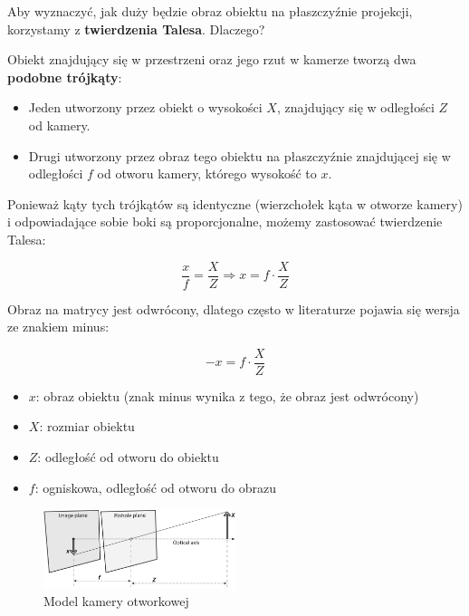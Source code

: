 \documentclass[magisterska]{pracadypl}
\begin{document}
Aby wyznaczyć, jak duży będzie obraz obiektu na płaszczyźnie projekcji, korzystamy z \textbf{twierdzenia Talesa}.  
Dlaczego?

Obiekt znajdujący się w przestrzeni oraz jego rzut w kamerze tworzą dwa \textbf{podobne trójkąty}:
\begin{itemize}
    \item Jeden utworzony przez obiekt o wysokości \( X \), znajdujący się w odległości \( Z \) od kamery.
    \item Drugi utworzony przez obraz tego obiektu na płaszczyźnie znajdującej się w odległości \( f \) od otworu kamery, którego wysokość to \( x \).
\end{itemize}

Ponieważ kąty tych trójkątów są identyczne (wierzchołek kąta w otworze kamery) i odpowiadające sobie boki są proporcjonalne, możemy zastosować twierdzenie Talesa:

\[
\frac{x}{f} = \frac{X}{Z} \Rightarrow x = f \cdot \frac{X}{Z}
\]

Obraz na matrycy jest odwrócony, dlatego często w literaturze pojawia się wersja ze znakiem minus:

\[
-x = f \cdot \frac{X}{Z}
\]

\begin{itemize}
  \item \textbf{$x$}: obraz obiektu (znak minus wynika z tego, że obraz jest odwrócony)
  \item \textbf{$X$}: rozmiar obiektu
  \item \textbf{$Z$}: odległość od otworu do obiektu
  \item \textbf{$f$}: ogniskowa, odległość od otworu do obrazu
\end{itemize}

\begin{figure}[H]  %
    \centering  %
    \includegraphics[width=0.5\textwidth]{images/pinhole.png}  %
    \captionsetup{font=footnotesize}
    \caption[Model kamery otworkowej. Learning OpenCV 3, O'Reilly, Str. 639]{Model kamery otworkowej}
    \label{fig:rpi}  %
\end{figure}
\end{document}
